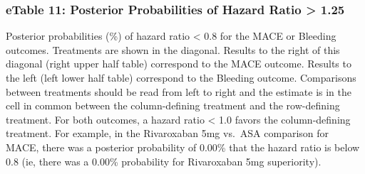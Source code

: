 \documentclass[
  12pt,
]{article}
\begin{document}
\begin{landscape}
\hypertarget{etable-11-posterior-probabilities-of-hazard-ratio-1.25}{%
\subsubsection{eTable 11: Posterior Probabilities of Hazard Ratio
\textgreater{}
1.25}\label{etable-11-posterior-probabilities-of-hazard-ratio-1.25}}

\begin{table}[!h]
\centering
{}
\end{table}

Posterior probabilities (\%) of hazard ratio \textless{} 0.8 for the
MACE or Bleeding outcomes. Treatments are shown in the diagonal. Results
to the right of this diagonal (right upper half table) correspond to the
MACE outcome. Results to the left (left lower half table) correspond to
the Bleeding outcome. Comparisons between treatments should be read from
left to right and the estimate is in the cell in common between the
column-defining treatment and the row-defining treatment. For both
outcomes, a hazard ratio \textless{} 1.0 favors the column-defining
treatment. For example, in the Rivaroxaban 5mg vs.~ASA comparison for
MACE, there was a posterior probability of 0.00\% that the hazard ratio
is below 0.8 (ie, there was a 0.00\% probability for Rivaroxaban 5mg
superiority).

\newpage


\end{landscape}
\end{document}
